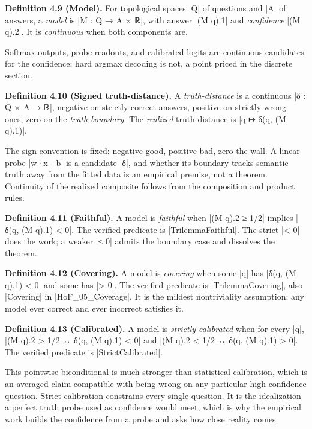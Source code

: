 \documentclass{memoir}
\begin{document}
\textbf{Definition 4.9 (Model).} For topological spaces \LeanVerb|Q| of questions and \LeanVerb|A| of answers,
a \emph{model} is \LeanVerb|M : Q → A × ℝ|, with answer \LeanVerb|(M q).1| and \emph{confidence} \LeanVerb|(M q).2|.
It is \emph{continuous} when both components are.

Softmax outputs, probe readouts, and calibrated logits are continuous candidates
for the confidence; hard argmax decoding is not, a point priced in the discrete
section.

\textbf{Definition 4.10 (Signed truth-distance).} A \emph{truth-distance} is a continuous
\LeanVerb|δ : Q × A → ℝ|, negative on strictly correct answers, positive on strictly
wrong ones, zero on the \emph{truth boundary}. The \emph{realized} truth-distance is \LeanVerb|q ↦ δ(q, (M q).1)|.

The sign convention is fixed: negative good, positive bad, zero the wall. A
linear probe \LeanVerb|w·x - b| is a candidate \LeanVerb|δ|, and whether its boundary tracks
semantic truth away from the fitted data is an empirical premise, not a theorem.
Continuity of the realized composite follows from the composition and product
rules.

\textbf{Definition 4.11 (Faithful).} A model is \emph{faithful} when \LeanVerb|(M q).2 ≥ 1/2| implies
\LeanVerb|δ(q, (M q).1) < 0|. The verified predicate is \LeanVerb|TrilemmaFaithful|. The strict \LeanVerb|< 0|
does the work; a weaker \LeanVerb|≤ 0| admits the boundary case and dissolves the
theorem.

\textbf{Definition 4.12 (Covering).} A model is \emph{covering} when some \LeanVerb|q| has
\LeanVerb|δ(q, (M q).1) < 0| and some has \LeanVerb|> 0|. The verified predicate is
\LeanVerb|TrilemmaCovering|, also \LeanVerb|Covering| in \LeanVerb|HoF_05_Coverage|. It is the mildest
nontriviality assumption: any model ever correct and ever incorrect satisfies
it.

\textbf{Definition 4.13 (Calibrated).} A model is \emph{strictly calibrated} when for every \LeanVerb|q|,
\LeanVerb|(M q).2 > 1/2 ↔ δ(q, (M q).1) < 0| and \LeanVerb|(M q).2 < 1/2 ↔ δ(q, (M q).1) > 0|. The
verified predicate is \LeanVerb|StrictCalibrated|.

This pointwise biconditional is much stronger than statistical calibration,
which is an averaged claim compatible with being wrong on any particular
high-confidence question. Strict calibration constrains every single question.
It is the idealization a perfect truth probe used as confidence would meet,
which is why the empirical work builds the confidence from a probe and asks how
close reality comes.
\end{document}

